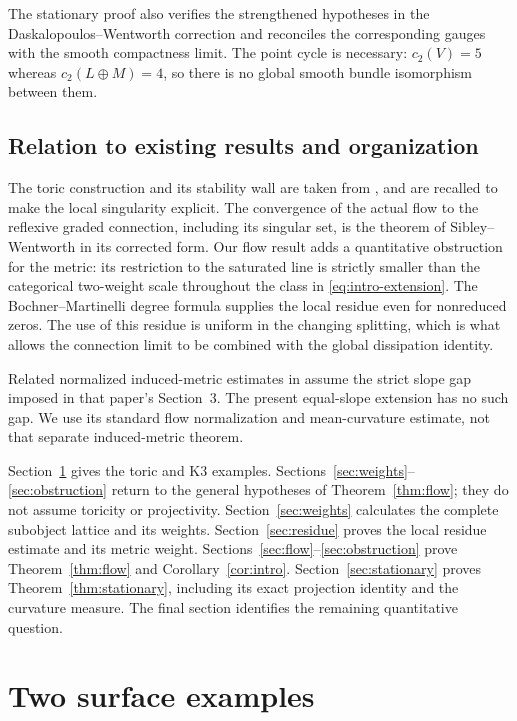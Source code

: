 \documentclass[11pt]{amsart}
\theoremstyle{definition}
\theoremstyle{remark}
\begin{document}
The stationary proof also verifies the strengthened hypotheses in the
Daskalopoulos--Wentworth correction \cite{daskalopouloswentworth2007}
and reconciles the corresponding gauges with the smooth compactness
limit. The point cycle is necessary: $c_2(V)=5$ whereas
$c_2(L\oplus M)=4$, so there is no global smooth bundle isomorphism
between them.

\subsection{Relation to existing results and organization}
The toric construction and its stability wall are taken from
\cite{wuebben2026}, and are recalled to make the local singularity explicit.
The convergence of the actual flow to the reflexive graded connection,
including its singular set, is the theorem of Sibley--Wentworth in its
corrected form. Our flow result adds a quantitative obstruction for the
metric: its restriction to the saturated line is strictly smaller than
the categorical two-weight scale throughout the class in
\eqref{eq:intro-extension}. The Bochner--Martinelli degree formula
\cite[Chapter~IV, \S2]{suwa2005} supplies the local residue even for
nonreduced zeros. The use of this residue is uniform
in the changing splitting, which is what allows the connection limit
to be combined with the global dissipation identity.

Related normalized induced-metric estimates in
\cite[Theorem~3.5]{lzz2016} assume the strict slope gap imposed in that
paper's Section~3. The present equal-slope extension has no such gap.
We use its standard flow normalization and mean-curvature estimate,
not that separate induced-metric theorem.

Section~\ref{sec:geometry} gives the toric and K3 examples.
Sections~\ref{sec:weights}--\ref{sec:obstruction} return to the general
hypotheses of Theorem~\ref{thm:flow}; they do not assume toricity or
projectivity. Section~\ref{sec:weights} calculates the complete subobject
lattice and its weights. Section~\ref{sec:residue} proves the
local residue estimate and its metric weight.
Sections~\ref{sec:flow}--\ref{sec:obstruction} prove
Theorem~\ref{thm:flow} and Corollary~\ref{cor:intro}.
Section~\ref{sec:stationary} proves Theorem~\ref{thm:stationary},
including its exact projection identity and the curvature measure.
The final section identifies the remaining quantitative question.

\section{Two surface examples}\label{sec:geometry}
\end{document}
